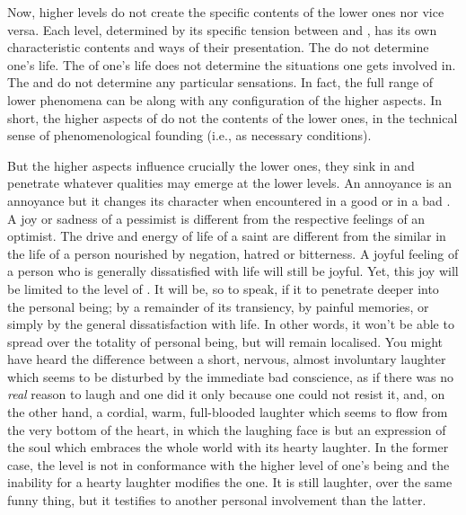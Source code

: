 
\pa\label{pa:notSchelerA} Now, higher levels do not create the specific contents
of the lower ones nor vice versa.  Each level, determined by its specific
tension between  and , has its own
characteristic contents and ways of their presentation.  The  do
not determine one's life.  The  of one's life does not determine the
 situations one gets involved in.  The   and
 do not determine any particular sensations.  In fact, the full
range of lower phenomena can be  along with any configuration of
the higher aspects.  In short, the higher aspects of  do not
 the contents of the lower ones, in the technical sense of phenomenological
founding (i.e., as necessary conditions).

But the higher aspects influence crucially the lower ones, they sink in and
penetrate whatever  
qualities may emerge at the lower levels. An annoyance is an annoyance 
but it changes its character when encountered in a good or in a bad 
. A joy or sadness of a pessimist is different from the 
respective feelings of an optimist. The drive and energy of life of a 
saint are different from the similar  in the life of 
a person nourished by negation, hatred or bitterness. 
%
A joyful feeling of a person who is generally dissatisfied with life will still
be joyful.  Yet, this joy will be limited to the level of .  It
will be, so to speak,  if it  to penetrate deeper into
the personal being;  by a remainder of its transiency, by painful
memories, or simply  by the general dissatisfaction with life.  In
other words, it won't be able to spread over the totality of personal being, but
will remain localised.  You might have heard the difference between a short,
nervous, almost involuntary laughter which seems to be disturbed by the
immediate bad conscience, as if there was no {\em real} reason to laugh and one
did it only because one could not resist it, and, on the other hand, a cordial,
warm, full-blooded laughter which seems to flow from the very bottom of the
heart, in which the laughing face is but an expression of the soul which
embraces the whole world with its hearty laughter.  In the former case, the
 level is not in conformance with the higher level of one's being and
the inability for a hearty laughter modifies the  one.  It is still
laughter, over the same funny thing, but it testifies to another personal
involvement than the latter.

